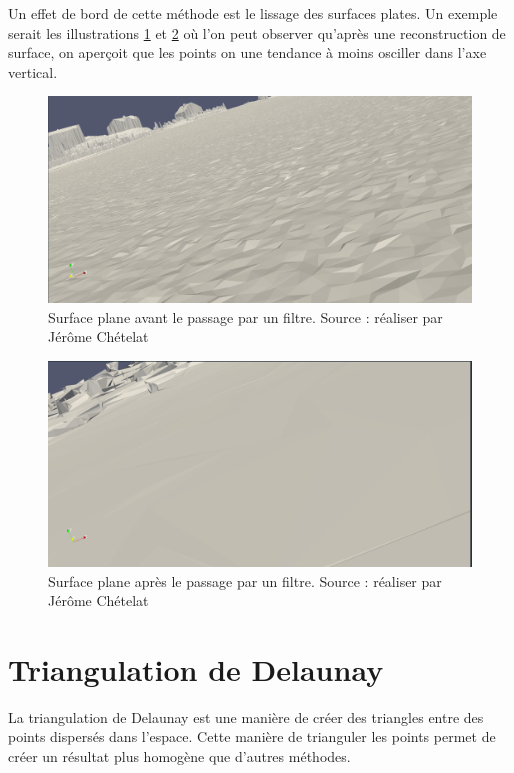 Un effet de bord de cette méthode est le lissage des surfaces plates. Un exemple serait les illustrations \ref{fig:before_las_filter} et \ref{fig:after_las_filter} où l'on peut observer qu'après une reconstruction de surface, on aperçoit que les points on une tendance à moins osciller dans l'axe vertical.

\begin{figure}[tbh!]
    \centering
    \includegraphics[width=0.8\linewidth]{figures/lissage_brut.png}
    \caption{Surface plane avant le passage par un filtre. Source : réaliser par Jérôme Chételat}
    \label{fig:before_las_filter}
\end{figure}
\begin{figure}[tbh!]
    \centering
    \includegraphics[width=0.8\linewidth]{figures/lissage_filtrer.png}
    \caption{Surface plane après le passage par un filtre. Source : réaliser par Jérôme Chételat}
    \label{fig:after_las_filter}
\end{figure}
\section{Triangulation de Delaunay}

La triangulation de Delaunay est une manière de créer des triangles entre des points dispersés dans l’espace.
Cette manière de trianguler les points permet de créer un résultat plus homogène que d’autres méthodes.

